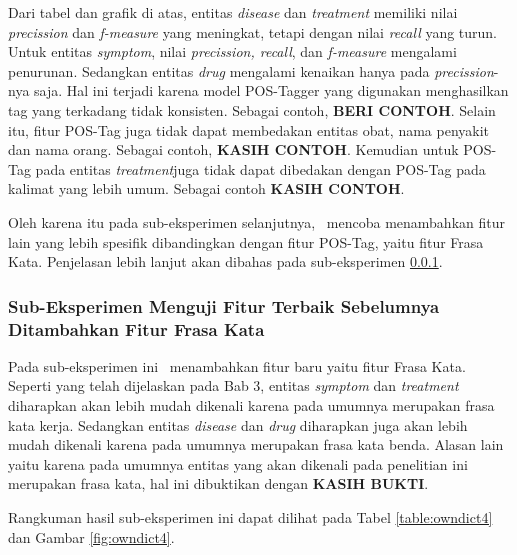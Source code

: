 	Dari tabel dan grafik di atas, entitas \textit{disease} dan \textit{treatment} memiliki nilai \textit{precission} dan \textit{f-measure} yang meningkat, tetapi dengan nilai \textit{recall} yang turun. Untuk entitas \textit{symptom}, nilai \textit{precission, recall}, dan \textit{f-measure} mengalami penurunan. Sedangkan entitas \textit{drug} mengalami kenaikan hanya pada \textit{precission}-nya saja. Hal ini terjadi karena model POS-Tagger yang digunakan menghasilkan tag yang terkadang tidak konsisten. Sebagai contoh, \textbf{BERI CONTOH}. Selain itu, fitur POS-Tag juga tidak dapat membedakan entitas obat, nama penyakit dan nama orang. Sebagai contoh, \textbf{KASIH CONTOH}. Kemudian untuk POS-Tag pada entitas \textit{treatment}juga tidak dapat dibedakan dengan POS-Tag pada kalimat yang lebih umum. Sebagai contoh \textbf{KASIH CONTOH}.
	
	Oleh karena itu pada sub-eksperimen selanjutnya, \saya~mencoba menambahkan fitur lain yang lebih spesifik dibandingkan dengan fitur POS-Tag, yaitu fitur Frasa Kata. Penjelasan lebih lanjut akan dibahas pada sub-eksperimen \ref{eks:subeksfrasa}.
	
	\subsubsection{Sub-Eksperimen Menguji Fitur Terbaik Sebelumnya Ditambahkan Fitur Frasa Kata}\label{eks:subeksfrasa}
	Pada sub-eksperimen ini \saya~menambahkan fitur baru yaitu fitur Frasa Kata. Seperti yang telah dijelaskan pada Bab 3, entitas \textit{symptom} dan \textit{treatment} diharapkan akan lebih mudah dikenali karena pada umumnya merupakan frasa kata kerja. Sedangkan entitas \textit{disease} dan \textit{drug} diharapkan juga akan lebih mudah dikenali karena pada umumnya merupakan frasa kata benda. Alasan lain yaitu karena pada umumnya entitas yang akan dikenali pada penelitian ini merupakan frasa kata, hal ini dibuktikan dengan \textbf{KASIH BUKTI}.
	
	Rangkuman hasil sub-eksperimen ini dapat dilihat pada Tabel \ref{table:owndict4} dan Gambar \ref{fig:owndict4}.
	
